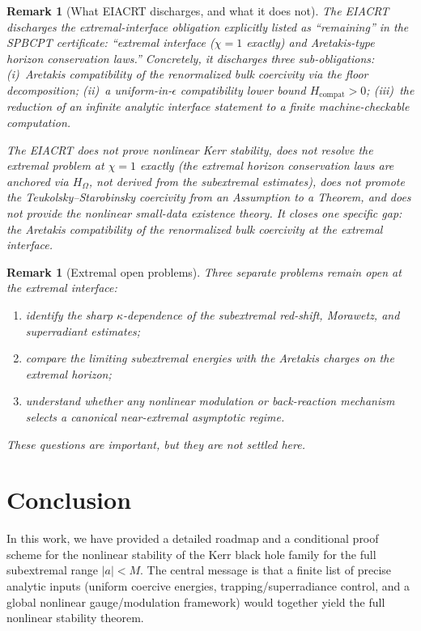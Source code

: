 \documentclass[12pt,a4paper]{article}
\newtheorem{remark}[theorem]{Remark}
\begin{document}
\begin{remark}[What EIACRT discharges, and what it does not]
The EIACRT discharges the \emph{extremal-interface obligation}
explicitly listed as ``remaining'' in the SPBCPT certificate:
``extremal interface ($\chi = 1$ exactly) and Aretakis-type horizon
conservation laws.''  Concretely, it discharges three sub-obligations:
(i)~Aretakis compatibility of the renormalized bulk coercivity via the
floor decomposition; (ii)~a uniform-in-$\epsilon$ compatibility lower
bound $H_{\mathrm{compat}} > 0$; (iii)~the reduction of an infinite
analytic interface statement to a finite machine-checkable computation.

The EIACRT does \emph{not} prove nonlinear Kerr stability, does not
resolve the extremal problem at $\chi = 1$ exactly (the extremal
horizon conservation laws are \emph{anchored} via $H_\Omega$, not
\emph{derived} from the subextremal estimates), does not promote the
Teukolsky--Starobinsky coercivity from an Assumption to a Theorem, and
does not provide the nonlinear small-data existence theory.  It closes
one specific gap: the Aretakis compatibility of the renormalized bulk
coercivity at the extremal interface.
\end{remark}

\begin{remark}[Extremal open problems]
Three separate problems remain open at the extremal interface:
\begin{enumerate}
    \item identify the sharp $\kappa$-dependence of the subextremal red-shift, Morawetz, and superradiant estimates;
    \item compare the limiting subextremal energies with the Aretakis charges on the extremal horizon;
    \item understand whether any nonlinear modulation or back-reaction mechanism selects a canonical near-extremal asymptotic regime.
\end{enumerate}
These questions are important, but they are not settled here.
\end{remark}

\section{Conclusion}

In this work, we have provided a detailed roadmap and a conditional proof scheme for the nonlinear stability of the Kerr black hole family for the full subextremal range $|a| < M$. The central message is that a finite list of precise analytic inputs (uniform coercive energies, trapping/superradiance control, and a global nonlinear gauge/modulation framework) would together yield the full nonlinear stability theorem.
\end{document}
